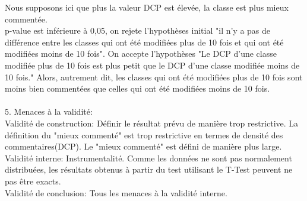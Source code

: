 \documentclass{article}
\begin{document}
{\begin{center}
\end{center}
Nous supposons ici que plus la valeur DCP est élevée, la classe est plus mieux commentée.\\
p-value est inférieure à 0,05, on rejete l'hypothèses initial "il n'y a pas de différence entre les classes qui ont été modifiées plus de 10 fois et qui ont été modifiées moins de 10 fois". On accepte l'hypothèses "Le DCP d'une classe modifiée plus de 10 fois est plus petit que le DCP d'une classe modifiée moins de 10 fois." Alors, autrement dit, les classes qui ont été modifiées plus de 10 fois sont moins bien commentées que celles qui ont été modifiées moins de 10 fois.\\
\\
5. Menaces à la validité:\\
Validité de construction: Définir le résultat prévu de manière trop restrictive. La définition du "mieux commenté" est trop restrictive en termes de densité des commentaires(DCP). Le "mieux commenté" est défini de manière plus large.\\
Validité interne: Instrumentalité. Comme les données ne sont pas normalement distribuées, les résultats obtenus à partir du test utilisant le T-Test peuvent ne pas être exacts.\\
Validité de conclusion: Tous les menaces à la validité interne.\\
}
\end{document}
